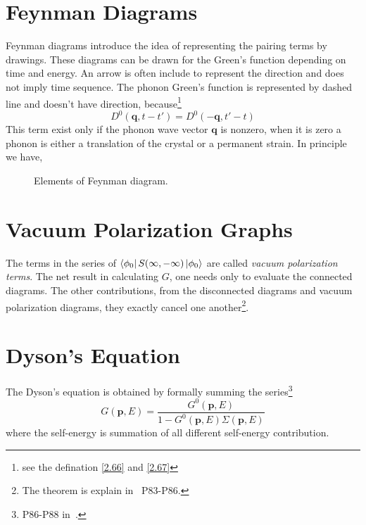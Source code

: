 \section{Feynman Diagrams}\label{s2.5}
Feynman diagrams introduce the idea of representing the pairing terms by drawings.
These diagrams can be drawn for the Green's function depending on time and energy.
An arrow is often include to represent the direction and does not imply time sequence.
The phonon Green's function is represented by dashed line and doesn't have direction, because\footnote{see the defination \eqref{2.66} and \eqref{2.67}}
\begin{equation}
  D^0(\mathbf{q},t-t') = D^0(-\mathbf{q},t'-t) \label{2.92}
\end{equation}
This term exist only if the phonon wave vector $\mathbf{q}$ is nonzero, when it is zero a phonon is either a translation of the crystal or a permanent strain.
In principle we have,
\begin{figure}
  \caption{Elements of Feynman diagram.}
\end{figure}

\section{Vacuum Polarization Graphs}\label{s2.6}
The terms in the series of $\bra{\phi_0}S(\infty,-\infty)\ket{\phi_0}$ are called \textit{vacuum polarization terms}.
The net result in calculating $G$, one needs only to evaluate the connected diagrams.
The other contributions, from the disconnected diagrams and vacuum polarization diagrams, they exactly cancel one another\footnote{The theorem is explain in~\cite{mah00} P83-P86. }.

\section{Dyson's Equation}\label{s2.7}
The Dyson's equation is obtained by formally summing the series\footnote{P86-P88 in~\cite{mah00}.}
\begin{equation}
  \label{2.114}
  G(\mathbf{p},E)=\frac{G^0(\mathbf{p},E)}{1-G^0(\mathbf{p},E)\Sigma(\mathbf{p},E)}
\end{equation}
where the self-energy is summation of all different self-energy contribution.

